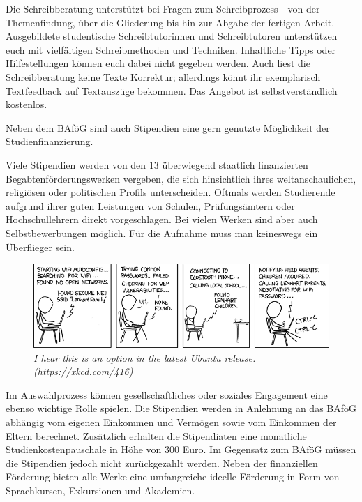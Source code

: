Die Schreibberatung unterstützt bei Fragen zum Schreibprozess - von der Themenfindung, über die Gliederung bis hin zur Abgabe der fertigen Arbeit. 
Ausgebildete studentische Schreibtutorinnen und Schreibtutoren unterstützen euch mit vielfältigen Schreibmethoden und Techniken. 
Inhaltliche Tipps oder Hilfestellungen können euch dabei nicht gegeben werden.
Auch liest die Schreibberatung keine Texte Korrektur; allerdings könnt ihr exemplarisch Textfeedback auf Textauszüge bekommen.
Das Angebot ist selbstverständlich kostenlos.


Neben dem BAföG sind auch Stipendien eine gern genutzte Möglichkeit der Studienfinanzierung.

Viele Stipendien werden von den 13 überwiegend staatlich finanzierten Begabtenförderungswerken vergeben, die sich hinsichtlich ihres weltanschaulichen, religiösen oder politischen Profils unterscheiden.
Oftmals werden Studierende aufgrund ihrer guten Leistungen von Schulen, Prüfungsämtern oder Hochschullehrern direkt vorgeschlagen.
Bei vielen Werken sind aber auch Selbstbewerbungen möglich.
Für die Aufnahme muss man keineswegs ein Überflieger sein.

\vfill

\begin{figure}[h!]
	\centering
	\includegraphics[width=\textwidth, keepaspectratio]{img/xkcd/zealous_autoconfig.png}
	\caption*{{\small \textit{I hear this is an option in the latest Ubuntu release. (https://xkcd.com/416)}}}
\end{figure}

\newpage
Im Auswahlprozess können gesellschaftliches oder soziales Engagement eine ebenso wichtige Rolle spielen.
Die Stipendien werden in Anlehnung an das BAföG abhängig vom eigenen Einkommen und Vermögen sowie vom Einkommen der Eltern berechnet.
Zusätzlich erhalten die Stipendiaten eine monatliche Studienkostenpauschale in Höhe von 300 Euro.
Im Gegensatz zum BAföG müssen die Stipendien jedoch nicht zurückgezahlt werden.
Neben der finanziellen Förderung bieten alle Werke eine umfangreiche ideelle Förderung in Form von Sprachkursen, Exkursionen und Akademien.

